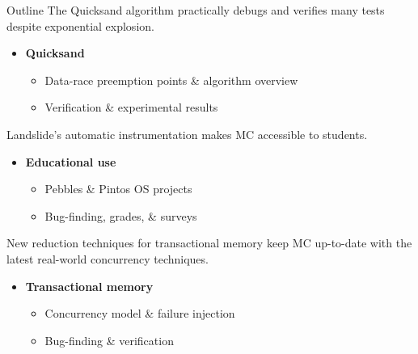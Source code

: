 \documentclass[xcolor=dvipsnames]{beamer}
\newcommand\hilight[2]{\color{#1}#2\color{black}}
\begin{document}
\begin{frame}{Outline}
	\hilight{sect-pastel-quicksand}{The Quicksand algorithm %
	practically debugs and verifies many tests despite exponential explosion.}
	\begin{itemize}
		\item {\bf Quicksand}
		\begin{itemize}
			\item Data-race preemption points \& algorithm overview
			\item Verification \& experimental results
		\end{itemize}
	\end{itemize}
	\hilight{sect-pastel-410}{Landslide's automatic instrumentation makes MC accessible to students.} \\
	\begin{itemize}
		\item {\bf Educational use}
		\begin{itemize}
			\item Pebbles \& Pintos OS projects
			\item Bug-finding, grades, \& surveys
		\end{itemize}
	\end{itemize}

	\hilight{sect-pastel-htm}{New reduction techniques for transactional memory keep MC up-to-date
	with the latest real-world concurrency techniques.} \\
	\begin{itemize}
		\item {\bf Transactional memory}
		\begin{itemize}
			\item Concurrency model \& failure injection
			\item Bug-finding \& verification
		\end{itemize}
	\end{itemize}
\end{frame}

\end{document}
